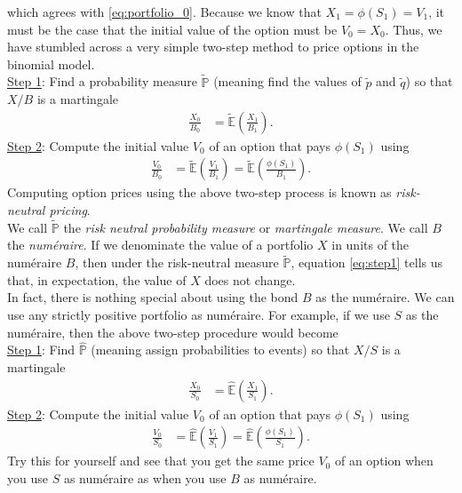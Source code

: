 \documentclass[12pt]{book}
\numberwithin{equation}{chapter}
\theoremstyle{plain}
\numberwithin{theorem}{section}
\theoremstyle{definition}
\numberwithin{exercise}{chapter}
\newcommand{\<}{\langle}
\renewcommand{\>}{\rangle}
\renewcommand{\(}{\left(}
\renewcommand{\)}{\right)}
\renewcommand{\[}{\left[}
\renewcommand{\]}{\right]}
\newcommand\Eb{\mathds{E}}
\newcommand\Pb{\mathds{P}}
\newcommand\Pbh{\widehat{\Pb}}
\newcommand\Ebh{\widehat{\Eb}}
\newcommand\Ebt{\widetilde{\Eb}}
\newcommand\Pbt{\widetilde{\Pb}}
\newcommand\qt{\widetilde{q}}
\theoremstyle{definition}
\numberwithin{question}{section}
\newcommand\pt{\widetilde{p}}
\begin{document}
which agrees with \eqref{eq:portfolio_0}.  Because we know that $X_1 = \phi(S_1) = V_1$, it must be the case that the initial value of the option must be $V_0 = X_0$.  Thus, we have stumbled across a very simple two-step method to price options in the binomial model.
\\[0.5em]
\underline{Step 1}:  Find a probability measure $\Pbt$ (meaning find the values of $\pt$ and $\qt$) so that $X/B$ is a martingale
\begin{align}
\frac{X_0}{B_0}
	&=	\Ebt \( \frac{X_1}{B_1} \) . \label{eq:step1}
\end{align}
\underline{Step 2}: Compute the initial value $V_0$ of an option that pays $\phi(S_1)$ using
\begin{align}
\frac{V_0}{B_0} 
	&= \Ebt \( \frac{V_1}{B_1} \) = \Ebt \( \frac{\phi(S_1)}{B_1} \) . \label{eq:step2}
\end{align}
Computing option prices using the above two-step process is known as \textit{risk-neutral pricing}.
\\[0.5em]
We call $\Pbt$ the \textit{risk neutral probability measure} or \textit{martingale measure}.  We call $B$ the \textit{num\'eraire}.
If we denominate the value of a portfolio $X$ in units of the num\'eraire $B$, then under the risk-neutral measure $\Pbt$, equation \eqref{eq:step1} tells us that, in expectation, the value of $X$ does not change.
\\[0.5em]
In fact, there is nothing special about using the bond $B$ as the num\'eraire.  We can use any strictly positive portfolio as num\'eraire.  For example, if we use $S$ as the num\'eraire, then the above two-step procedure would become
\\[0.5em]
\underline{Step 1}:  Find $\Pbh$ (meaning assign probabilities to events) so that $X/S$ is a martingale
\begin{align}
\frac{X_0}{S_0}
	&=	\Ebh \( \frac{X_1}{S_1} \) . 
\end{align}
\underline{Step 2}: Compute the initial value $V_0$ of an option that pays $\phi(S_1)$ using
\begin{align}
\frac{V_0}{S_0} 
	&= \Ebh \( \frac{V_1}{S_1} \) = \Ebh \( \frac{\phi(S_1)}{S_1} \) . 
\end{align}
Try this for yourself and see that you get the same price $V_0$ of an option when you use $S$ as num\'eraire as when you use $B$ as num\'eraire.
\end{document}
